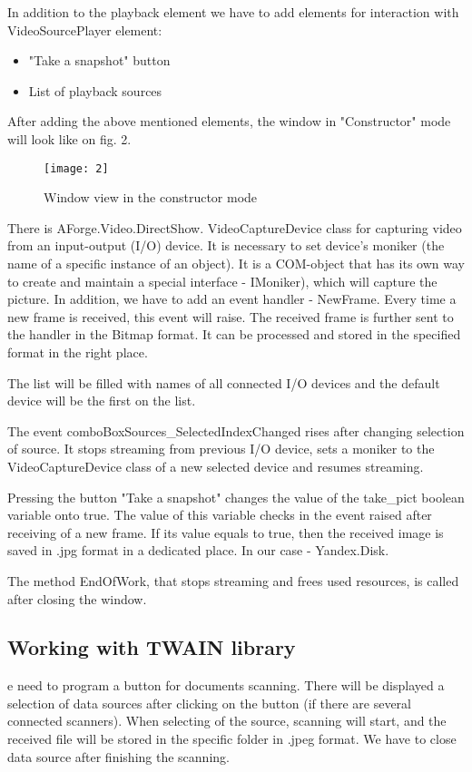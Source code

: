 \documentclass[12pt,journal,compsoc]{D:/Магистратура/English/bare_conf/IEEEtran}
\begin{document}
In addition to the playback element we have to add elements for interaction with VideoSourcePlayer element:
\begin{itemize}
\item "Take a snapshot" button
\item List of playback sources
\end{itemize}
After adding the above mentioned  elements, the window in "Constructor" mode will look like on fig. 2.
\begin{figure}[h]
\centering
\texttt{[image: 2]}
\centering
\caption{Window view in the constructor mode}
\end{figure}

There is AForge.Video.DirectShow. VideoCaptureDevice class for capturing video from an input-output (I/O) device. It is necessary to set device's moniker (the name of a specific instance of an object). It is a COM-object that has its own way to create and maintain a special interface - IMoniker), which will capture the picture. In addition, we have to add an event handler - NewFrame. Every time a new frame is received, this event will raise. The received frame is further sent to the handler in the Bitmap format. It can be processed and stored in the specified format in the right place.

The list will be filled with names of all connected I/O devices and the default device will be the first on the list.

The event comboBoxSources\_SelectedIndexChanged rises after changing selection of source. It stops streaming from previous I/O device, sets a moniker to the VideoCaptureDevice class of a new selected device and resumes streaming.

Pressing the button "Take a snapshot" changes the value of the take\_pict boolean variable onto true. The value of this variable checks in the event raised after receiving of a new frame. If its value equals to true, then the received image is saved in .jpg format in a dedicated place. In our case - Yandex.Disk.

The method EndOfWork, that stops streaming and frees used resources, is called after  closing the window.

\subsection{Working with TWAIN library}
e need to program a button for documents scanning. There will be displayed a selection of data sources after clicking on the button (if there are several connected scanners). When selecting of the source, scanning will start, and the received file will be stored in the specific folder in .jpeg format. We have to close data source after finishing the scanning.
\end{document}
